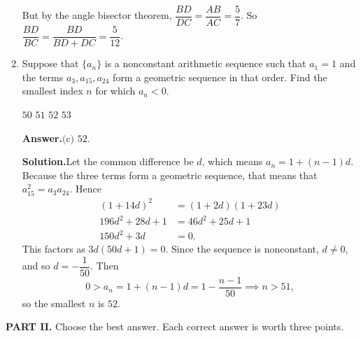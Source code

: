 \documentclass[11pt,paper=letter]{scrartcl}
\newcommand{\ans}{{\sffamily \bfseries Answer.}\;}
\newcommand{\ansb}[2]{\ans\(\boxed{\text{(#1) #2}}\).}
\newcommand{\sol}{{\sffamily \bfseries Solution.}\;}
\begin{document}
\begin{enumerate}[left=0pt]
But by the angle bisector theorem, $\dfrac{BD}{DC} = \dfrac{AB}{AC} = \dfrac{5}{7}$. So $\dfrac{BD}{BC} = \dfrac{BD}{BD + DC} = \dfrac{5}{12}$.

\item Suppose that $\{a_n\}$ is a nonconstant arithmetic sequence such that $a_1 = 1$ and the terms $a_3, a_{15}, a_{24}$ form a geometric sequence in that order. Find the smallest index $n$ for which $a_n < 0$.

\fourch
{$50$}
{$51$}
{$52$}
{$53$}

\ansb{c}{$52$}

\sol Let the common difference be $d$, which means $a_n = 1 + (n-1)d$. Because the three terms form a geometric sequence, that means that $a_{15}^2 = a_3a_{24}$. Hence
\begin{align*}
(1 + 14d)^2 &= (1 + 2d)(1 + 23d) \\
196d^2 + 28d + 1 &= 46d^2 + 25d + 1 \\
150d^2 + 3d &= 0.
\end{align*}
This factors as $3d(50d + 1) = 0$. Since the sequence is nonconstant, $d \ne 0$, and so $d = -\dfrac{1}{50}$. Then \[
  0 > a_n = 1 + (n-1)d = 1 - \frac{n-1}{50} \implies n > 51,
\]
so the smallest $n$ is $52$.

\end{enumerate}

\noindent\textbf{PART II.} Choose the best answer. Each correct answer is worth three points.
\end{document}
